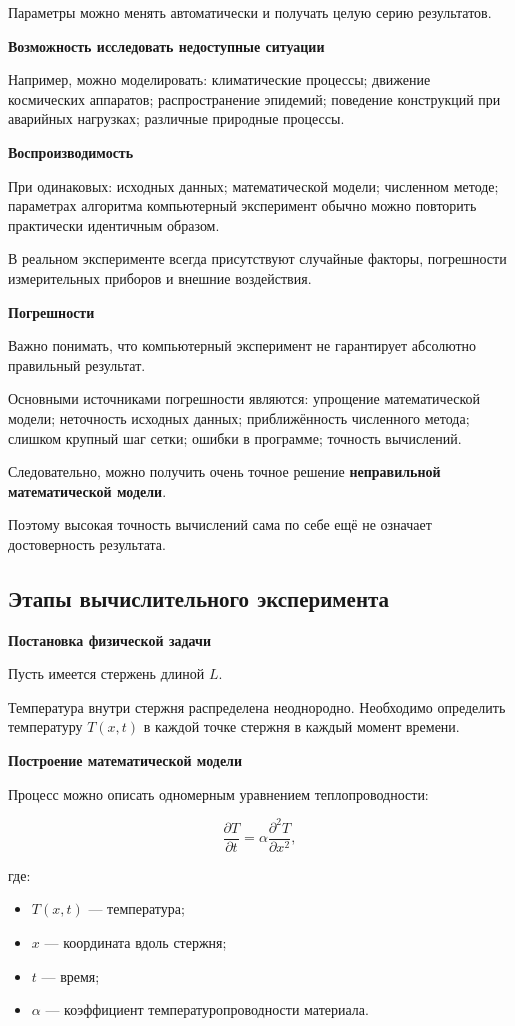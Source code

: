 Параметры можно менять автоматически и получать целую серию результатов.

\textbf{Возможность исследовать недоступные ситуации}

Например, можно моделировать: климатические процессы; движение космических аппаратов; распространение эпидемий; поведение конструкций при аварийных нагрузках; различные природные процессы.

\textbf{Воспроизводимость}

При одинаковых: исходных данных; математической модели; численном методе; параметрах алгоритма компьютерный эксперимент обычно можно повторить практически идентичным образом.

В реальном эксперименте всегда присутствуют случайные факторы,
погрешности измерительных приборов и внешние воздействия.


\textbf{Погрешности}

Важно понимать, что компьютерный эксперимент не гарантирует
абсолютно правильный результат.

Основными источниками погрешности являются: упрощение математической модели;  неточность исходных данных; приближённость численного метода; слишком крупный шаг сетки; ошибки в программе; точность вычислений.

Следовательно, можно получить очень точное решение
\textbf{неправильной математической модели}.

Поэтому высокая точность вычислений сама по себе ещё не означает
достоверность результата.

\subsection{Этапы вычислительного эксперимента}

\textbf{Постановка физической задачи}

Пусть имеется стержень длиной $L$.

Температура внутри стержня распределена неоднородно. Необходимо
определить температуру $T(x,t)$ в каждой точке стержня в каждый
момент времени.

\textbf{Построение математической модели}

Процесс можно описать одномерным уравнением теплопроводности:

\[
\frac{\partial T}{\partial t}
=
\alpha
\frac{\partial^2 T}{\partial x^2},
\]

где:

\begin{itemize}
	\item $T(x,t)$ --- температура;
	\item $x$ --- координата вдоль стержня;
	\item $t$ --- время;
	\item $\alpha$ --- коэффициент температуропроводности материала.
\end{itemize}

